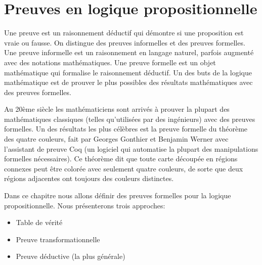 % 			
% 				
% 	
	\chapter{Preuves en logique propositionnelle}
		Une preuve est un raisonnement déductif qui démontre si une proposition
est vraie ou fausse.
On distingue des preuves informelles et des preuves formelles.
Une preuve informelle est un raisonnement en langage naturel, parfois augmenté avec des
notations mathématiques.
Une preuve formelle est un objet mathématique qui formalise le raisonnement déductif.
Un des buts de la logique mathématique est de prouver le plus possibles des résultats
mathématiques avec des preuves formelles.

Au 20ème siècle les mathématiciens sont arrivés à prouver la plupart des mathématiques
classiques (telles qu'utilisées par des ingénieurs) avec des preuves formelles.
Un des résultats les plus célèbres est la preuve formelle du théorème des quatre couleurs,
fait par Georges Gonthier et Benjamin Werner avec l'assistant de preuve Coq (un logiciel
qui automatise la plupart des manipulations formelles nécessaires).
Ce théorème dit que toute carte découpée en régions connexes peut être colorée avec seulement
quatre couleurs, de sorte que deux régions adjacentes ont toujours des couleurs distinctes.

Dans ce chapitre nous allons définir des preuves formelles pour la logique propositionnelle.
Nous présenterons trois approches:
		\begin{itemize}
			\item Table de vérité
			\item Preuve transformationnelle
			\item Preuve déductive (la plus générale)		
		\end{itemize}

